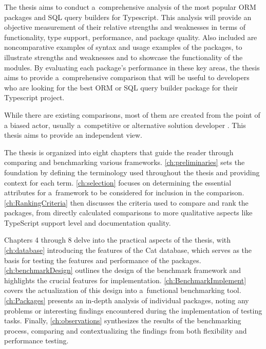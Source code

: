 The thesis aims to conduct a~comprehensive analysis of the most popular ORM
packages and SQL query builders for Typescript. This analysis will provide an
objective measurement of their relative strengths and weaknesses in terms of
functionality, type support, performance, and package quality. Also included are
noncomparative examples of syntax and usage examples of the packages, to
illustrate strengths and weaknesses and to showcase the functionality of the
modules. By evaluating each package's performance in these key areas, the thesis
aims to provide a~comprehensive comparison that will be useful to developers who
are looking for the best ORM or SQL query builder package for their Typescript
project.

While there are existing comparisons, most of them are created from the point of
a biased actor, usually a~competitive or alternative solution developer
\cite{drizzleComparison} \cite{imdbBench}. This thesis aims to provide an
independent view.


The thesis is organized into eight chapters that guide the reader
through comparing and benchmarking various frameworks.
\autoref{ch:preliminaries} sets the foundation by defining the terminology used
throughout the thesis and providing context for each term.
\autoref{ch:selection} focuses on determining the essential attributes for
a~framework to be considered for inclusion in the comparison.
\autoref{ch:RankingCriteria} then discusses the criteria used to compare and
rank the packages, from directly calculated comparisons to more qualitative
aspects like TypeScript support level and documentation quality. 

Chapters 4 through 8 delve into the practical aspects of the thesis, with
\autoref{ch:database} introducing the features of the Cat database, which serves
as the basis for testing the features and performance of the packages.
\autoref{ch:benchmarkDesign} outlines the design of the benchmark framework and
highlights the crucial features for implementation.
\autoref{ch:BenchmarkImplement} covers the actualization of this design into
a~functional benchmarking tool. \autoref{ch:Packages} presents an in-depth
analysis of individual packages, noting any problems or interesting findings
encountered during the implementation of testing tasks. Finally,
\autoref{ch:observations} synthesizes the results of the benchmarking process,
comparing and contextualizing the findings from both flexibility and performance
testing.